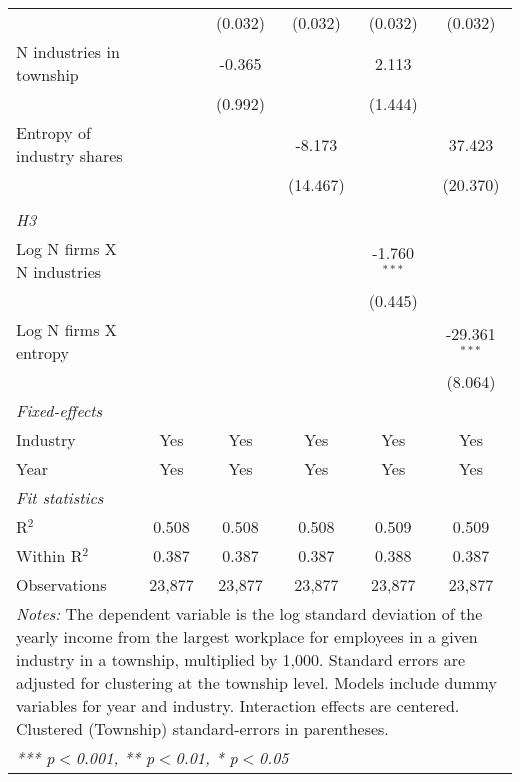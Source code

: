 \begin{tabular}{lccccc}
                                        &                  & (0.032)          & (0.032)          & (0.032)          & (0.032)\\   
   N industries in township             &                  & -0.365           &                  & 2.113            &   \\   
                                        &                  & (0.992)          &                  & (1.444)          &   \\   
   Entropy of industry shares           &                  &                  & -8.173           &                  & 37.423\\   
                                        &                  &                  & (14.467)         &                  & (20.370)\\   
\hdashline %
\\[0.1ex] %
\emph{H3} \\ 
   Log N firms X N industries           &                  &                  &                  & -1.760$^{***}$   &   \\   
                                        &                  &                  &                  & (0.445)          &   \\   
   Log N firms X entropy                &                  &                  &                  &                  & -29.361$^{***}$\\   
                                        &                  &                  &                  &                  & (8.064)\\   
   \midrule
   \emph{Fixed-effects}\\
   Industry                             & Yes              & Yes              & Yes              & Yes              & Yes\\  
   Year                                 & Yes              & Yes              & Yes              & Yes              & Yes\\  
   \midrule
   \emph{Fit statistics}\\
   R$^2$                                & 0.508            & 0.508            & 0.508            & 0.509            & 0.509\\  
   Within R$^2$                         & 0.387            & 0.387            & 0.387            & 0.388            & 0.387\\  
   Observations                         & 23,877           & 23,877           & 23,877           & 23,877           & 23,877\\  
   \midrule \midrule
\multicolumn{6}{p{16cm}}{\emph{Notes:} The dependent variable is the log 
    standard deviation of the yearly income from the largest workplace for 
    employees in a given industry in a township, multiplied by 1,000. Standard 
    errors are adjusted for clustering at the township level. Models include 
    dummy variables for year and industry. Interaction effects are centered. 
    Clustered (Township) standard-errors in parentheses.}\\
\multicolumn{6}{l}{\emph{*** p$<$0.001, ** p$<$0.01, * p$<$0.05}} \\ 
\end{tabular}
\par\endgroup
